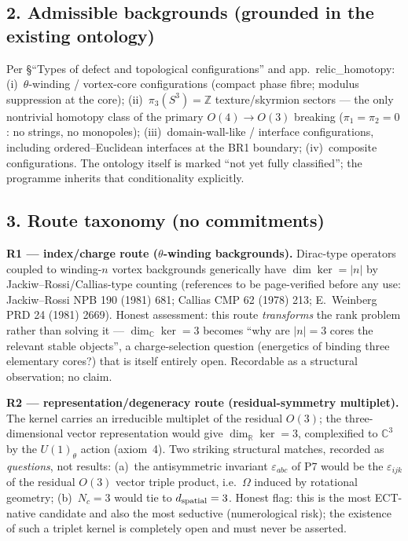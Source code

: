 \subsection*{2. Admissible backgrounds (grounded in the existing
ontology)}
Per \S ``Types of defect and topological configurations'' and
app.~relic\_homotopy:
(i)~$\theta$-winding / vortex-core configurations (compact phase
fibre; modulus suppression at the core);
(ii)~$\pi_3(S^3)=\mathbb Z$ texture/skyrmion sectors --- the only
nontrivial homotopy class of the primary $O(4)\to O(3)$ breaking
($\pi_1=\pi_2=0$: no strings, no monopoles);
(iii)~domain-wall-like / interface configurations, including
ordered--Euclidean interfaces at the BR1 boundary;
(iv)~composite configurations.
The ontology itself is marked ``not yet fully classified''; the
programme inherits that conditionality explicitly.

\subsection*{3. Route taxonomy (no commitments)}
\textbf{R1 --- index/charge route ($\theta$-winding
backgrounds).}
Dirac-type operators coupled to winding-$n$ vortex backgrounds
generically have $\dim\ker=|n|$ by Jackiw--Rossi/Callias-type
counting (references to be page-verified before any use:
Jackiw--Rossi NPB 190 (1981) 681; Callias CMP 62 (1978) 213;
E.~Weinberg PRD 24 (1981) 2669).
Honest assessment: this route \emph{transforms} the rank problem
rather than solving it --- $\dim_{\mathbb C}\ker=3$ becomes ``why
are $|n|=3$ cores the relevant stable objects'', a
charge-selection question (energetics of binding three elementary
cores?) that is itself entirely open.
Recordable as a structural observation; no claim.

\textbf{R2 --- representation/degeneracy route (residual-symmetry
multiplet).}
The kernel carries an irreducible multiplet of the residual
$O(3)$; the three-dimensional vector representation would give
$\dim_{\mathbb R}\ker=3$, complexified to $\mathbb C^3$ by the
$U(1)_\theta$ action (axiom~4).
Two striking structural matches, recorded as \emph{questions},
not results:
(a)~the antisymmetric invariant $\varepsilon_{abc}$ of P7 would
be the $\varepsilon_{ijk}$ of the residual $O(3)$ vector triple
product, i.e.\ $\Omega$ induced by rotational geometry;
(b)~$N_c=3$ would tie to $d_{\rm spatial}=3$.
Honest flag: this is the most ECT-native candidate and also the
most seductive (numerological risk); the existence of such a
triplet kernel is completely open and must never be asserted.

